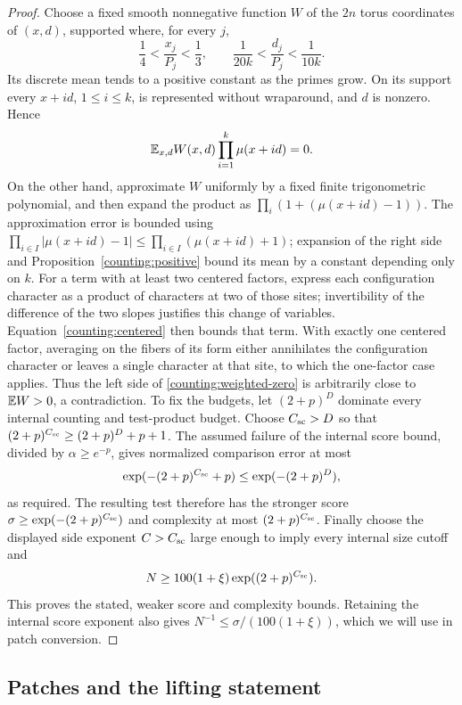 \begin{proof}
Choose a fixed smooth nonnegative function $W$ of the $2n$ torus
coordinates of $(x,d)$, supported where, for every $j$,
\[
 \frac14<\frac{x_j}{P_j}<\frac13,
 \qquad
 \frac1{20k}<\frac{d_j}{P_j}<\frac1{10k}.
\]
Its discrete mean tends to a positive constant as the primes grow.
On its support every $x+id$, $1\leq i\leq k$, is represented without
wraparound, and $d$ is nonzero.  Hence
\begin{equation}\label{counting:weighted-zero}
 \mathbb E_{x,d}W(x,d)\prod_{i=1}^k\mu(x+id)=0.
\end{equation}
On the other hand, approximate $W$ uniformly by a fixed finite
trigonometric polynomial, and then expand the product as
$\prod_i(1+(\mu(x+id)-1))$.
The approximation error is bounded using
$\prod_{i\in I}|\mu(x+id)-1|\leq\prod_{i\in I}(\mu(x+id)+1)$; expansion
of the right side and Proposition~\ref{counting:positive} bound its
mean by a constant depending only on $k$.  For a term with at least two centered factors,
express each configuration character as a product of characters at two
of those sites; invertibility of the difference of the two slopes
justifies this change of variables.  Equation~\eqref{counting:centered}
then bounds that term.  With exactly one centered factor, averaging
on the fibers of its form either annihilates the configuration character
or leaves a single character at that site, to which the one-factor
case applies.  Thus the left side of \eqref{counting:weighted-zero} is
arbitrarily close to $\mathbb E W>0$, a contradiction.  To fix the budgets,
let $(2+p)^D$ dominate every internal counting and test-product budget.
Choose $C_{\rm sc}>D$ so that
$(2+p)^{C_{\rm sc}}\geq(2+p)^D+p+1$.
The assumed failure of the internal score bound, divided by
$\alpha\geq e^{-p}$, gives normalized comparison error at most
\[
 \exp(-(2+p)^{C_{\rm sc}}+p)\leq\exp(-(2+p)^D),
\]
as required.  The resulting test therefore has the stronger score
$\sigma\geq\exp(-(2+p)^{C_{\rm sc}})$ and complexity at most
$(2+p)^{C_{\rm sc}}$.  Finally choose the displayed side exponent
$C>C_{\rm sc}$ large enough to imply every internal size cutoff and
\[
 N\geq100(1+\xi)\exp((2+p)^{C_{\rm sc}}).
\]
This proves the stated, weaker score and complexity bounds.  Retaining
the internal score exponent also gives
$N^{-1}\leq\sigma/(100(1+\xi))$, which we will use in patch conversion.
\end{proof}

\subsection{Patches and the lifting statement}

